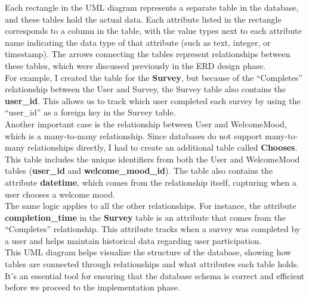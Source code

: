 \noindent Each rectangle in the UML diagram represents a separate table in the database, and these tables hold the actual data. Each attribute listed in the rectangle corresponds to a column in the table, with the value types next to each attribute name indicating the data type of that attribute (such as text, integer, or timestamp). The arrows connecting the tables represent relationships between these tables, which were discussed previously in the ERD design phase.\vspace{5mm} \\
For example, I created the table for the \textbf{Survey}, but because of the ``Completes'' relationship between the User and Survey, the Survey table also contains the \textbf{user\_id}. This allows us to track which user completed each survey by using the ``user\_id'' as a foreign key in the Survey table.\vspace{5mm} \\
Another important case is the relationship between User and WelcomeMood, which is a many-to-many relationship. Since databases do not support many-to-many relationships directly, I had to create an additional table called \textbf{Chooses}. This table includes the unique identifiers from both the User and WelcomeMood tables (\textbf{user\_id} and \textbf{welcome\_mood\_id}). The table also contains the attribute \textbf{datetime}, which comes from the relationship itself, capturing when a user chooses a welcome mood.\vspace{5mm} \\
The same logic applies to all the other relationships. For instance, the attribute \textbf{completion\_time} in the \textbf{Survey} table is an attribute that comes from the ``Completes'' relationship. This attribute tracks when a survey was completed by a user and helps maintain historical data regarding user participation.\vspace{5mm} \\
This UML diagram helps visualize the structure of the database, showing how tables are connected through relationships and what attributes each table holds. It’s an essential tool for ensuring that the database schema is correct and efficient before we proceed to the implementation phase.

